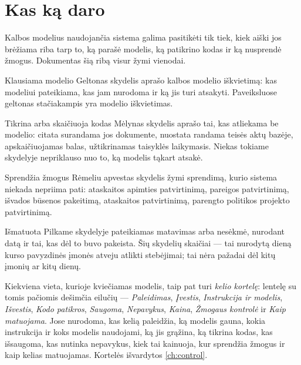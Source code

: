 \section*{Kas ką daro}

Kalbos modelius naudojančia sistema galima pasitikėti tik tiek, kiek aiški jos brėžiama riba
tarp to, ką parašė modelis, ką patikrino kodas ir ką nusprendė žmogus. Dokumentas šią ribą
visur žymi vienodai.

\begin{aibox}{Klausiama modelio}
Geltonas skydelis aprašo kalbos modelio iškvietimą: kas modeliui pateikiama, kas jam nurodoma
ir ką jis turi atsakyti. Paveiksluose geltonas stačiakampis yra modelio iškvietimas.
\end{aibox}

\begin{codebox}{Tikrina arba skaičiuoja kodas}
Mėlynas skydelis aprašo tai, kas atliekama be modelio: citata surandama jos dokumente,
nuostata randama teisės aktų bazėje, apskaičiuojamas balas, užtikrinamas taisyklės laikymasis.
Niekas tokiame skydelyje nepriklauso nuo to, ką modelis tąkart atsakė.
\end{codebox}

\begin{humanbox}{Sprendžia žmogus}
Rėmeliu apvestas skydelis žymi sprendimą, kurio sistema niekada nepriima pati: ataskaitos
apimties patvirtinimą, pareigos patvirtinimą, išvados būsenos pakeitimą, ataskaitos
patvirtinimą, parengto politikos projekto patvirtinimą.
\end{humanbox}

\begin{lessonbox}{Išmatuota}
Pilkame skydelyje pateikiamas matavimas arba nesėkmė, nurodant datą ir tai, kas dėl to buvo
pakeista. Šių skydelių skaičiai --- tai nurodytą dieną kurso pavyzdinės įmonės atveju atlikti
stebėjimai; tai nėra pažadai dėl kitų įmonių ar kitų dienų.
\end{lessonbox}

Kiekviena vieta, kurioje kviečiamas modelis, taip pat turi \emph{kelio kortelę}: lentelę su
tomis pačiomis dešimčia eilučių --- \emph{Paleidimas}, \emph{Įvestis}, \emph{Instrukcija ir
modelis}, \emph{Išvestis}, \emph{Kodo patikros}, \emph{Saugoma}, \emph{Nepavykus},
\emph{Kaina}, \emph{Žmogaus kontrolė} ir \emph{Kaip matuojama}. Jose nurodoma, kas kelią
paleidžia, ką modelis gauna, kokia instrukcija ir koks modelis naudojami, ką jis grąžina, ką
tikrina kodas, kas išsaugoma, kas nutinka nepavykus, kiek tai kainuoja, kur sprendžia žmogus ir
kaip kelias matuojamas. Kortelės išvardytos \cref{ch:control}.

